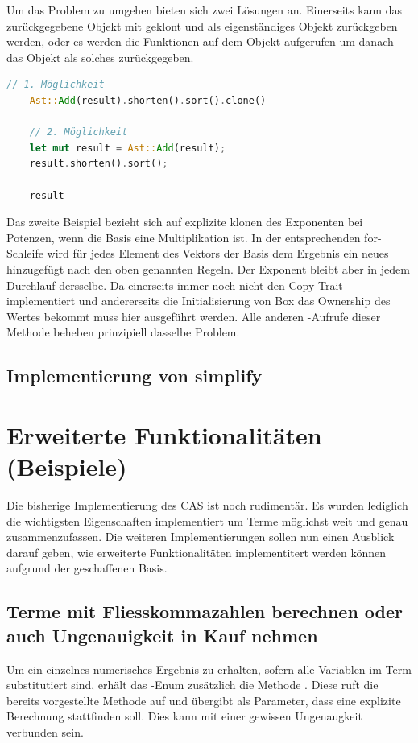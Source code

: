 \documentclass[11pt,a4paper, ngerman]{article}
\begin{document}
Um das Problem zu umgehen bieten sich zwei Lösungen an. Einerseits kann das zurückgegebene Objekt mit  geklont und als eigenständiges Objekt zurückgeben werden, oder es werden die Funktionen auf dem Objekt aufgerufen um danach das Objekt als solches zurückgegeben.

\begin{lstlisting}[language=rust, caption={Mögliche Lösungen für Rückgabewerte}]
    // 1. Möglichkeit
    Ast::Add(result).shorten().sort().clone()

    // 2. Möglichkeit
    let mut result = Ast::Add(result);
    result.shorten().sort();

    result
\end{lstlisting}

Das zweite Beispiel bezieht sich auf explizite klonen des Exponenten bei Potenzen, wenn die Basis eine Multiplikation ist. In der entsprechenden for-Schleife wird für jedes Element des Vektors der Basis dem Ergebnis ein neues hinzugefügt nach den oben genannten Regeln. Der Exponent bleibt aber in jedem Durchlauf dersselbe. Da  einerseits immer noch nicht den Copy-Trait implementiert und andererseits die Initialisierung von Box das Ownership des Wertes bekommt muss hier  ausgeführt werden. Alle anderen -Aufrufe dieser Methode beheben prinzipiell dasselbe Problem.

\subsection{Implementierung von simplify}

\newpage

\section{Erweiterte Funktionalitäten (Beispiele)}
Die bisherige Implementierung des CAS ist noch rudimentär. Es wurden lediglich die wichtigsten Eigenschaften implementiert um Terme möglichst weit und genau zusammenzufassen.
Die weiteren Implementierungen sollen nun einen Ausblick darauf geben, wie erweiterte Funktionalitäten implementitert werden können aufgrund der geschaffenen Basis. 

\subsection{Terme mit Fliesskommazahlen berechnen oder auch Ungenauigkeit in Kauf nehmen} Um ein einzelnes numerisches Ergebnis zu erhalten, sofern alle Variablen im Term substitutiert sind, erhält das -Enum zusätzlich die Methode . Diese ruft die bereits vorgestellte Methode  auf und übergibt als Parameter, dass eine explizite Berechnung stattfinden soll. Dies kann mit einer gewissen Ungenaugkeit verbunden sein.
\end{document}
